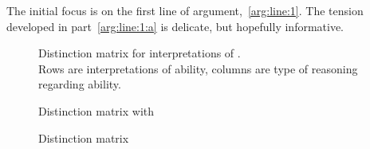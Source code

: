 \begin{note}
  The initial focus is on the first line of argument,~\ref{arg:line:1}.
  The tension developed in part~\ref{arg:line:1:a} is delicate, but hopefully informative.
\end{note}

\begin{note}[Table]
  \begin{figure}[H]
    \saMtxEmpty{}
    \caption{Distinction matrix for interpretations of . \\ Rows are interpretations of ability, columns are type of reasoning regarding ability.}
    \label{fig:saMtxEmpty}
  \end{figure}
\end{note}

\begin{note}
  \begin{figure}[H]
    \centering
    \saMtxInterpreted{}
    \caption{Distinction matrix with }
    \label{fig:saMtxInterpreted}
  \end{figure}
\end{note}

\begin{note}
  \begin{figure}[H]
    \centering
    \saMtxRuledOut{}
    \caption{Distinction matrix}
    \label{fig:saMtxRuledOut}
  \end{figure}
\end{note}

